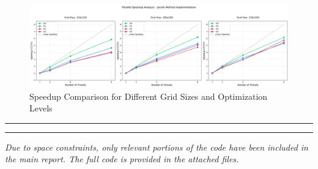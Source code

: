 \documentclass{article}
\begin{document}
\begin{figure}[H]
    \centering
    \includegraphics[width=\linewidth]{Images/Plot2.png}
    \caption{Speedup Comparison for Different Grid Sizes and Optimization Levels}
    \label{fig:plot2}
\end{figure}

\rule{\linewidth}{0.5pt}

\printbibliography

\hrule

\textit{Due to space constraints, only relevant portions of the code have been included in the main report. The full code is provided in the attached files.}
\end{document}
